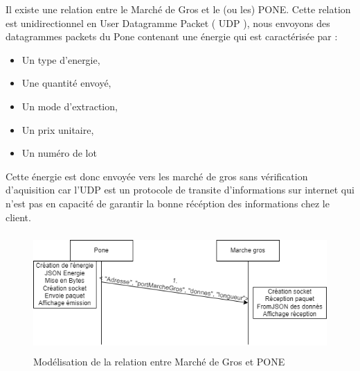 Il existe une relation entre le Marché de Gros et le (ou les) PONE. Cette relation est unidirectionnel en User Datagramme Packet ( UDP ), nous envoyons des datagrammes packets du Pone contenant une énergie qui est caractérisée par :
\\
\begin{itemize}
    \item Un type d'energie,
    \item Une quantité envoyé,
    \item Un mode d'extraction,
    \item Un prix unitaire,
    \item Un numéro de lot
    \\
\end{itemize}
 Cette énergie est donc envoyée vers les marché de gros sans vérification d'aquisition car l'UDP est un protocole de transite d'informations sur internet qui n'est pas en capacité de garantir la bonne récéption des informations chez le client.
\begin{figure}[h]
    \centering
    \includegraphics[width=120mm, height=45mm]{images/PONEMG.png}
    \caption{Modélisation de la relation entre Marché de Gros et PONE}
    \label{img:mesh16}
\end{figure}
